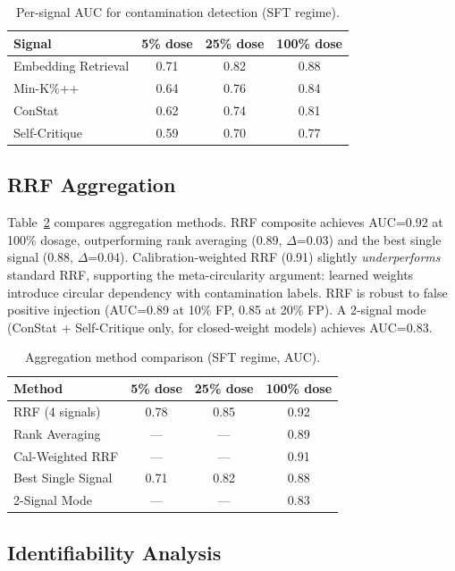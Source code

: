 \documentclass[letterpaper]{article}
\begin{document}
\begin{table}[t]
\centering
\caption{Per-signal AUC for contamination detection (SFT regime).}
\label{tab:signals}
\begin{tabular}{lccc}
\toprule
Signal & 5\% dose & 25\% dose & 100\% dose \\
\midrule
Embedding Retrieval & 0.71 & 0.82 & 0.88 \\
Min-K\%++           & 0.64 & 0.76 & 0.84 \\
ConStat             & 0.62 & 0.74 & 0.81 \\
Self-Critique       & 0.59 & 0.70 & 0.77 \\
\bottomrule
\end{tabular}
\end{table}

\subsection{RRF Aggregation}
\label{sec:rrf}

Table~\ref{tab:rrf} compares aggregation methods.
RRF composite achieves AUC=0.92 at 100\% dosage, outperforming rank averaging (0.89, $\Delta$=0.03) and the best single signal (0.88, $\Delta$=0.04).
Calibration-weighted RRF (0.91) slightly \emph{underperforms} standard RRF, supporting the meta-circularity argument: learned weights introduce circular dependency with contamination labels.
RRF is robust to false positive injection (AUC=0.89 at 10\% FP, 0.85 at 20\% FP).
A 2-signal mode (ConStat + Self-Critique only, for closed-weight models) achieves AUC=0.83.

\begin{table}[t]
\centering
\caption{Aggregation method comparison (SFT regime, AUC).}
\label{tab:rrf}
\begin{tabular}{lccc}
\toprule
Method & 5\% dose & 25\% dose & 100\% dose \\
\midrule
RRF (4 signals)      & 0.78 & 0.85 & 0.92 \\
Rank Averaging        & ---  & ---  & 0.89 \\
Cal-Weighted RRF      & ---  & ---  & 0.91 \\
Best Single Signal    & 0.71 & 0.82 & 0.88 \\
2-Signal Mode         & ---  & ---  & 0.83 \\
\bottomrule
\end{tabular}
\end{table}

\subsection{Identifiability Analysis}
\label{sec:identifiability}
\end{document}
